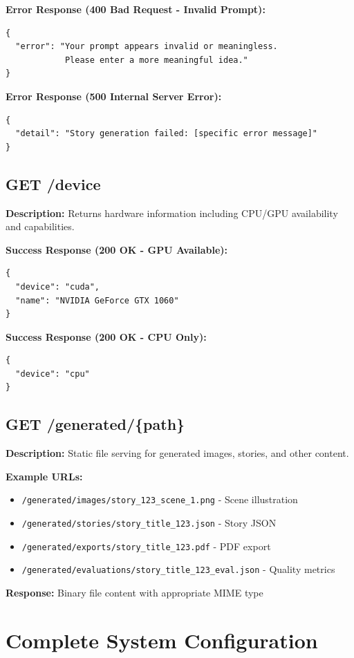 {\textbf{Error Response (400 Bad Request - Invalid Prompt):}
\begin{verbatim}
{
  "error": "Your prompt appears invalid or meaningless. 
            Please enter a more meaningful idea."
}
\end{verbatim}

\textbf{Error Response (500 Internal Server Error):}
\begin{verbatim}
{
  "detail": "Story generation failed: [specific error message]"
}
\end{verbatim}

\subsection{GET /device}
\textbf{Description:} Returns hardware information including CPU/GPU availability and capabilities.

\textbf{Success Response (200 OK - GPU Available):}
\begin{verbatim}
{
  "device": "cuda",
  "name": "NVIDIA GeForce GTX 1060"
}
\end{verbatim}

\textbf{Success Response (200 OK - CPU Only):}
\begin{verbatim}
{
  "device": "cpu"
}
\end{verbatim}

\subsection{GET /generated/\{path\}}
\textbf{Description:} Static file serving for generated images, stories, and other content.

\textbf{Example URLs:}
\begin{itemize}
    \item \texttt{/generated/images/story\_123\_scene\_1.png} - Scene illustration
    \item \texttt{/generated/stories/story\_title\_123.json} - Story JSON
    \item \texttt{/generated/exports/story\_title\_123.pdf} - PDF export
    \item \texttt{/generated/evaluations/story\_title\_123\_eval.json} - Quality metrics
\end{itemize}

\textbf{Response:} Binary file content with appropriate MIME type

\section{Complete System Configuration}

}
